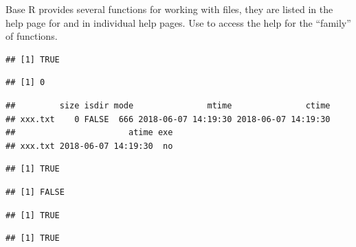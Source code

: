 \documentclass[krantz2]{krantz}\usepackage{knitr}%
\begin{document}
Base R provides several functions for working with files, they are listed in the help page for  and in individual help pages. Use  to access the help for the ``family'' of functions.

\begin{knitrout}\footnotesize
{}\color{fgcolor}\begin{kframe}
\begin{alltt}
 \hlstd{(}\hlopt{!}\hlstd{(}\hlstd{)) \{}
  \hlstd{(}\hlstd{)}
\hlstd{\}}
\end{alltt}
\begin{verbatim}
## [1] TRUE
\end{verbatim}
\begin{alltt}
\hlstd{(}\hlstd{)}
\end{alltt}
\begin{verbatim}
## [1] 0
\end{verbatim}
\begin{alltt}
\hlstd{(}\hlstd{)}
\end{alltt}
\begin{verbatim}
##         size isdir mode               mtime               ctime
## xxx.txt    0 FALSE  666 2018-06-07 14:19:30 2018-06-07 14:19:30
##                       atime exe
## xxx.txt 2018-06-07 14:19:30  no
\end{verbatim}
\begin{alltt}
\hlstd{(}\hlstd{,} \hlstd{)}
\end{alltt}
\begin{verbatim}
## [1] TRUE
\end{verbatim}
\begin{alltt}
\hlstd{(}\hlstd{)}
\end{alltt}
\begin{verbatim}
## [1] FALSE
\end{verbatim}
\begin{alltt}
\hlstd{(}\hlstd{)}
\end{alltt}
\begin{verbatim}
## [1] TRUE
\end{verbatim}
\begin{alltt}
\hlstd{(}\hlstd{)}
\end{alltt}
\begin{verbatim}
## [1] TRUE
\end{verbatim}
\end{kframe}
\end{knitrout}
\end{document}
